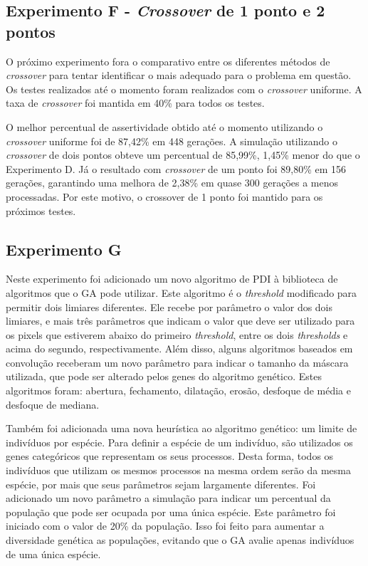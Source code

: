 \documentclass[12pt,oneside,a4paper,english,french,spanish,brazil,]{abntex2}
\begin{document}
\subsection{Experimento F - \textit{Crossover} de 1 ponto e 2 pontos}

O próximo experimento fora o comparativo entre os diferentes métodos de \textit{crossover} para tentar identificar o mais adequado para o problema em questão. Os testes realizados até o momento foram realizados com o \textit{crossover} uniforme. A taxa de \textit{crossover} foi mantida em 40\% para todos os testes.

O melhor percentual de assertividade obtido até o momento utilizando o \textit{crossover} uniforme foi de 87,42\% em 448 gerações. A simulação utilizando o \textit{crossover} de dois pontos obteve um percentual de 85,99\%, 1,45\% menor do que o Experimento D. Já o resultado com \textit{crossover} de um ponto foi 89,80\% em 156 gerações, garantindo uma melhora de 2,38\% em quase 300 gerações a menos processadas. Por este motivo, o crossover de 1 ponto foi mantido para os próximos testes.

\subsection{Experimento G}

Neste experimento foi adicionado um novo algoritmo de PDI à biblioteca de algoritmos que o GA pode utilizar. Este algoritmo é o \textit{threshold} modificado para permitir dois limiares diferentes. Ele recebe por parâmetro o valor dos dois limiares, e mais três parâmetros que indicam o valor que deve ser utilizado para os pixels que estiverem abaixo do primeiro \textit{threshold}, entre os dois \textit{thresholds} e acima do segundo, respectivamente. Além disso, alguns algoritmos baseados em convolução receberam um novo parâmetro para indicar o tamanho da máscara utilizada, que pode ser alterado pelos genes do algoritmo genético. Estes algoritmos foram: abertura, fechamento, dilatação, erosão, desfoque de média e desfoque de mediana.

Também foi adicionada uma nova heurística ao algoritmo genético: um limite de indivíduos por espécie. Para definir a espécie de um indivíduo, são utilizados os genes categóricos que representam os seus processos. Desta forma, todos os indivíduos que utilizam os mesmos processos na mesma ordem serão da mesma espécie, por mais que seus parâmetros sejam largamente diferentes. Foi adicionado um novo parâmetro a simulação para indicar um percentual da população que pode ser ocupada por uma única espécie. Este parâmetro foi iniciado com o valor de 20\% da população. Isso foi feito para aumentar a diversidade genética as populações, evitando que o GA avalie apenas indivíduos de uma única espécie.
\end{document}
